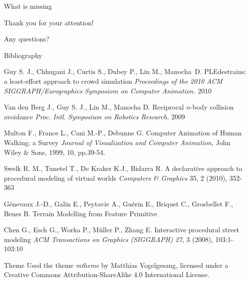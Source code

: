 \documentclass{beamer}
\begin{document}
\begin{frame}{What is missing}
\begin{LARGE}
\begin{center}
  Thank you for your attention!
  
  Any questions?
    \end{center}
  \end{LARGE}
\end{frame}


\begin{frame}[allowframebreaks]{Bibliography}
  \begin{thebibliography}{10}


    Guy S. J., Chhugani J., Curtis S., Dubey P., Lin M., Manocha~D.
    \newblock PLEdestrains: a least-effort approach to crowd simulation
    \newblock \emph{Proceedings of the 2010 ACM SIGGRAPH/Eurographics Symposiom on Computer Animation.} 2010

    Van den Berg J., Guy S. J., Lin M., Manocha D.
    \newblock Reciprocal $n$-body collision avoidance
    \newblock \emph{Proc. Intl. Symposium on Robotics Research.} 2009

    Multon F., France L., Cani M.-P., Debunne G.
    \newblock Computer Animation of Human Walking: a Survey
    \newblock \emph{Journal of Visualization and Computer Animation,} John Wiley \& Sons, 1999, 10, pp.39-54.


    Swelk R. M., Tunetel T., De Kraker K.J., Bidarra R.
    \newblock A declarative approach to procedural modeling of virtual worlds
    \newblock \emph{Computers \& Graphics} 35, 2 (2010), 352-363

    Génevaux J.-D., Galin E., Peytavie A., Guérin E., Briquet C., Grosbellet F., Benes B.
    \newblock Terrain Modelling from Feature Primitive

    Chen G., Esch G., Worka P., Müller P., Zhang E.
    \newblock Interactive procedural street modeling
    \newblock \emph{ACM Transactions on Graphics (SIGGRAPH) 27}, 3 (2008), 103:1-103:10




  \end{thebibliography} 
\end{frame}

\begin{frame}{Theme}
  Used the theme \emph{mtheme} by Matthias Vogelgesang, licensed under a Creative Commons
  Attribution-ShareAlike 4.0 International License.
\end{frame}
\end{document}
